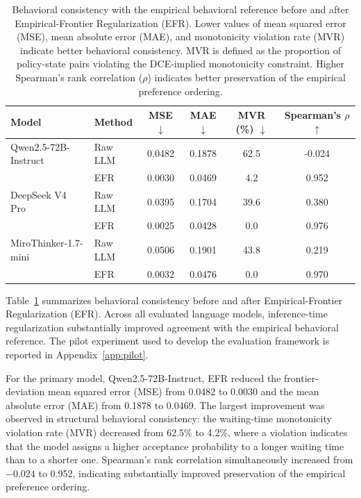 \documentclass[11pt]{article}
\begin{document}
\begin{table}[t]
\centering
\caption{Behavioral consistency with the empirical behavioral reference before and after Empirical-Frontier Regularization (EFR). Lower values of mean squared error (MSE), mean absolute error (MAE), and monotonicity violation rate (MVR) indicate better behavioral consistency. MVR is defined as the proportion of policy-state pairs violating the DCE-implied monotonicity constraint. Higher Spearman's rank correlation ($\rho$) indicates better preservation of the empirical preference ordering.}
\label{tab:behavioral_alignment}

\begin{tabular}{llcccc}
\toprule
Model & Method & MSE $\downarrow$ & MAE $\downarrow$ & MVR (\%) $\downarrow$ & Spearman's $\rho$ $\uparrow$\\
\midrule

Qwen2.5-72B-Instruct
& Raw LLM
& 0.0482
& 0.1878
& 62.5
& -0.024 \\

& EFR
& 0.0030
& 0.0469
& 4.2
& 0.952 \\

\addlinespace

DeepSeek V4 Pro
& Raw LLM
& 0.0395
& 0.1704
& 39.6
& 0.380 \\

& EFR
& 0.0025
& 0.0428
& 0.0
& 0.976 \\

\addlinespace

MiroThinker-1.7-mini
& Raw LLM
& 0.0506
& 0.1901
& 43.8
& 0.219 \\

& EFR
& 0.0032
& 0.0476
& 0.0
& 0.970 \\

\bottomrule
\end{tabular}
\end{table}

Table~\ref{tab:behavioral_alignment} summarizes behavioral consistency before and after Empirical-Frontier Regularization (EFR). Across all evaluated language models, inference-time regularization substantially improved agreement with the empirical behavioral reference. The pilot experiment used to develop the evaluation framework is reported in Appendix~\ref{app:pilot}.

For the primary model, Qwen2.5-72B-Instruct, EFR reduced the frontier-deviation mean squared error (MSE) from 0.0482 to 0.0030 and the mean absolute error (MAE) from 0.1878 to 0.0469. The largest improvement was observed in structural behavioral consistency: the waiting-time monotonicity violation rate (MVR) decreased from 62.5\% to 4.2\%, where a violation indicates that the model assigns a higher acceptance probability to a longer waiting time than to a shorter one. Spearman's rank correlation simultaneously increased from $-0.024$ to 0.952, indicating substantially improved preservation of the empirical preference ordering.
\end{document}
